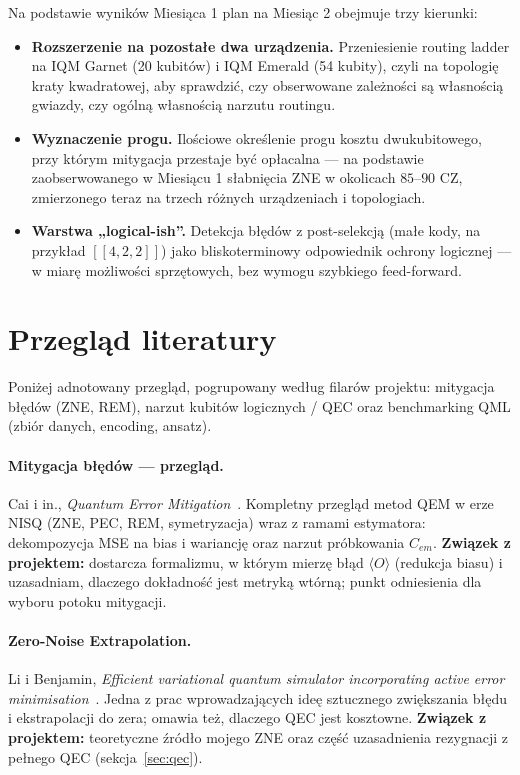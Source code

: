 \documentclass[11pt,a4paper]{article}
\begin{document}
Na podstawie wyników Miesiąca 1 plan na Miesiąc 2 obejmuje trzy kierunki:

\begin{itemize}
\item \textbf{Rozszerzenie na pozostałe dwa urządzenia.} Przeniesienie routing ladder na
      IQM Garnet (20 kubitów) i IQM Emerald (54 kubity), czyli na topologię kraty
      kwadratowej, aby sprawdzić, czy obserwowane zależności są własnością gwiazdy, czy
      ogólną własnością narzutu routingu.
\item \textbf{Wyznaczenie progu.} Ilościowe określenie progu kosztu dwukubitowego, przy
      którym mitygacja przestaje być opłacalna --- na podstawie zaobserwowanego w Miesiącu 1
      słabnięcia ZNE w okolicach $85$--$90$ CZ, zmierzonego teraz na trzech różnych
      urządzeniach i topologiach.
\item \textbf{Warstwa „logical-ish”.} Detekcja błędów z post-selekcją (małe kody, na przykład
      $[[4,2,2]]$) jako bliskoterminowy odpowiednik ochrony logicznej --- w miarę możliwości
      sprzętowych, bez wymogu szybkiego feed-forward.
\end{itemize}

\section{Przegląd literatury}
\label{sec:literatura}

Poniżej adnotowany przegląd, pogrupowany według filarów projektu: mitygacja błędów
(ZNE, REM), narzut kubitów logicznych / QEC oraz benchmarking QML (zbiór danych, encoding,
ansatz).

\paragraph{Mitygacja błędów --- przegląd.}
Cai i in., \emph{Quantum Error Mitigation}~\cite{cai2023}. Kompletny przegląd metod QEM
w erze NISQ (ZNE, PEC, REM, symetryzacja) wraz z ramami estymatora: dekompozycja MSE na bias
i wariancję oraz narzut próbkowania $C_{em}$. \textbf{Związek z projektem:} dostarcza
formalizmu, w którym mierzę błąd $\langle O\rangle$ (redukcja biasu) i uzasadniam, dlaczego
dokładność jest metryką wtórną; punkt odniesienia dla wyboru potoku mitygacji.

\paragraph{Zero-Noise Extrapolation.}
Li i Benjamin, \emph{Efficient variational quantum simulator incorporating active error
minimisation}~\cite{li2017}. Jedna z prac wprowadzających ideę sztucznego zwiększania błędu
i ekstrapolacji do zera; omawia też, dlaczego QEC jest kosztowne. \textbf{Związek z projektem:} teoretyczne źródło mojego ZNE
oraz część uzasadnienia rezygnacji z pełnego QEC (sekcja~\ref{sec:qec}).
\end{document}
